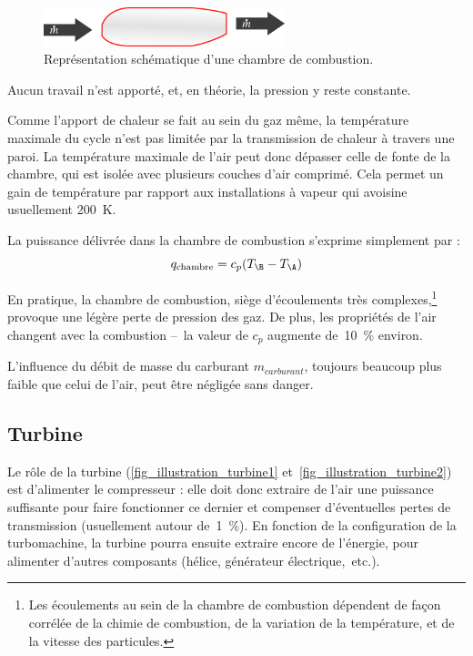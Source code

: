 		\begin{figure}
			\begin{center}
				\includegraphics[width=7cm]{images/symbole_chambre_combustion.png}
			\end{center}
			\caption{Représentation schématique d’une chambre de combustion.}
			\label{fig_chambre_de_combustion2}
		\end{figure}

		Aucun travail n’est apporté, et, en théorie, la pression y reste constante.

		Comme l’apport de chaleur se fait au sein du gaz même, la température maximale du cycle n’est pas limitée par la transmission de chaleur à travers une paroi. La température maximale de l’air peut donc dépasser celle de fonte de la chambre, qui est isolée avec plusieurs couches d’air comprimé. Cela permet un gain de température par rapport aux installations à vapeur qui avoisine usuellement \SI{200}{\kelvin}.

		La puissance délivrée dans la chambre de combustion s’exprime simplement par :
		\begin{equation}
			q_{\text{chambre}} = c_p (T_\B - T_\A )
		\end{equation}

		En pratique, la chambre de combustion, siège d’écoulements très complexes,\footnote{Les écoulements au sein de la chambre de combustion dépendent de façon corrélée de la chimie de combustion, de la variation de la température, et de la vitesse des particules.}
		provoque une légère perte de pression des gaz. De plus, les propriétés de l’air changent avec la combustion --\ la valeur de $c_p$ augmente de~\SI{10}{\percent} environ.

		L’influence du débit de masse du carburant $m_{carburant}$, toujours beaucoup plus faible que celui de l’air, peut être négligée sans danger.



	\subsection{Turbine}

		Le rôle de la turbine (\cref{fig_illustration_turbine1} et~\ref{fig_illustration_turbine2}) est d’alimenter le compresseur : elle doit donc extraire de l’air une puissance suffisante pour faire fonctionner ce dernier et compenser d’éventuelles pertes de transmission (usuellement autour de~\SI{1}{\percent}). En fonction de la configuration de la turbomachine, la turbine pourra ensuite extraire encore de l’énergie, pour alimenter d’autres composants (hélice, générateur électrique,~etc.).

